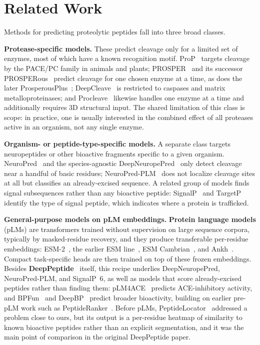 \documentclass{article}
\begin{document}
\section{Related Work}
\label{sec:related}

Methods for predicting proteolytic peptides fall into three broad classes.

\textbf{Protease-specific models.} These predict cleavage only for a limited set of enzymes, most of which have a known recognition motif. ProP~\citep{duckert2004prop} targets cleavage by the PACE/PC family in animals and plants; PROSPER~\citep{song2012prosper} and its successor PROSPERous~\citep{song2018prosperous} predict cleavage for one chosen enzyme at a time, as does the later ProsperousPlus~\citep{li2023prosperousplus}; DeepCleave~\citep{li2020deepcleave} is restricted to caspases and matrix metalloproteinases; and Procleave~\citep{li2020procleave} likewise handles one enzyme at a time and additionally requires 3D structural input. The shared limitation of this class is scope: in practice, one is usually interested in the combined effect of all proteases active in an organism, not any single enzyme.

\textbf{Organism- or peptide-type-specific models.} A separate class targets neuropeptides or other bioactive fragments specific to a given organism. NeuroPred~\citep{southey2006neuropred} and the species-agnostic DeepNeuropePred~\citep{wang2024deepneuropepred} only detect cleavage near a handful of basic residues; NeuroPred-PLM~\citep{wang2023neuropredplm} does not localize cleavage sites at all but classifies an already-excised sequence. A related group of models finds signal subsequences rather than any bioactive peptide: SignalP~\citep{teufel2022signalp6} and TargetP~\citep{almagro2019targetp} identify the type of signal peptide, which indicates where a protein is trafficked.

\textbf{General-purpose models on pLM embeddings.} \textbf{Protein language models} (pLMs) are transformers trained without supervision on large sequence corpora, typically by masked-residue recovery, and they produce transferable per-residue embeddings: ESM-2~\citep{lin2023esm2}, the earlier ESM line~\citep{esm2_2019}, ESM Cambrian~\citep{esm_cambrian_blog_2024,ESM-family}, and Ankh~\citep{ankh2023}. Compact task-specific heads are then trained on top of these frozen embeddings. Besides \textbf{DeepPeptide}~\citep{deeppeptide2023} itself, this recipe underlies DeepNeuropePred, NeuroPred-PLM, and SignalP~6, as well as models that score already-excised peptides rather than finding them: pLM4ACE~\citep{du2024plm4ace} predicts ACE-inhibitory activity, and BPFun~\citep{bpfun2025} and DeepBP~\citep{zhang2024deepbp} predict broader bioactivity, building on earlier pre-pLM work such as PeptideRanker~\citep{mooney2012peptideranker}. Before pLMs, PeptideLocator~\citep{mooney2013peptidelocator} addressed a problem close to ours, but its output is a per-residue heatmap of similarity to known bioactive peptides rather than an explicit segmentation, and it was the main point of comparison in the original DeepPeptide paper.
\end{document}
